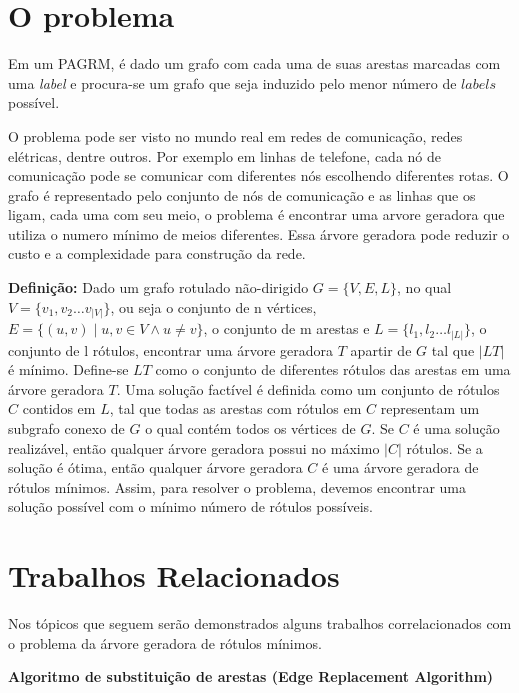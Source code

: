 \documentclass[12pt]{article}
\begin{document}
	\section{O problema}\label{sec:problema}

		\noindent Em um PAGRM, é dado um grafo com cada uma de suas arestas marcadas com uma \textit{label} e procura-se um grafo que seja induzido pelo menor número de $labels$ possível.

		O problema pode ser visto no mundo real em redes de comunicação, redes elétricas, dentre outros. Por exemplo em linhas de telefone, cada nó de comunicação pode se comunicar com diferentes nós escolhendo diferentes rotas. O grafo é representado pelo conjunto de nós de comunicação e as linhas que os ligam, cada uma com seu meio, o problema é encontrar uma arvore geradora que utiliza o numero mínimo de meios diferentes. Essa árvore geradora pode reduzir o custo e a complexidade para construção da rede.

		\textbf{Definição:}
		Dado um grafo rotulado não-dirigido $G = \{V, E, L\}$, no qual $V = \{v_1, v_2 \dots v_{|V|}\}$, ou seja o conjunto de n vértices, $E = \{(u, v) \mid u, v \in V \wedge u \neq v\}$, o conjunto de m arestas e $L = \{l_1, l_2 \dots l_{|L|}\}$, o conjunto de l rótulos, encontrar uma árvore geradora $T$ apartir de $G$ tal que $|LT|$ é mínimo. Define-se $LT$ como o conjunto de diferentes rótulos das arestas em uma árvore geradora $T$.
		Uma solução factível é definida como um conjunto de rótulos $C$ contidos em $L$, tal que todas as arestas com rótulos em $C$ representam um subgrafo conexo de $G$ o qual contém todos os vértices de $G$. Se $C$ é uma solução realizável, então qualquer árvore geradora possui no máximo $|C|$ rótulos. Se a solução é ótima, então qualquer árvore geradora $C$ é uma árvore geradora de rótulos mínimos. Assim, para resolver o problema, devemos encontrar uma solução possível com o mínimo número de rótulos possíveis.
	

	\section{Trabalhos Relacionados}\label{sec:trabalhosRelacioandos}

	Nos tópicos que seguem serão demonstrados alguns trabalhos correlacionados com o problema da árvore geradora de rótulos mínimos.

	\noindent\textbf{Algoritmo de substituição de arestas (Edge Replacement Algorithm)}\\
\end{document}
